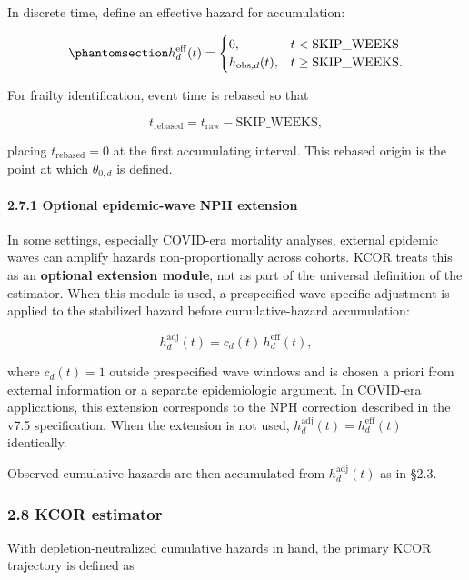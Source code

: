 \documentclass[
]{article}
\begin{document}
In discrete time, define an effective hazard for accumulation:

\begin{equation}\protect\phantomsection\label{eq:effective-hazard-skip}{
h_d^{\mathrm{eff}}(t)=
\begin{cases}
0, & t < \mathrm{SKIP\_WEEKS} \\
h_{\mathrm{obs},d}(t), & t \ge \mathrm{SKIP\_WEEKS}.
\end{cases}
}\end{equation}

For frailty identification, event time is rebased so that

\[
t_{\mathrm{rebased}} = t_{\mathrm{raw}} - \mathrm{SKIP\_WEEKS},
\]

placing \(t_{\mathrm{rebased}}=0\) at the first accumulating interval.
This rebased origin is the point at which \(\theta_{0,d}\) is defined.

\paragraph{2.7.1 Optional epidemic-wave NPH
extension}\label{optional-epidemic-wave-nph-extension}

In some settings, especially COVID-era mortality analyses, external
epidemic waves can amplify hazards non-proportionally across cohorts.
KCOR treats this as an \textbf{optional extension module}, not as part
of the universal definition of the estimator. When this module is used,
a prespecified wave-specific adjustment is applied to the stabilized
hazard before cumulative-hazard accumulation:

\[
h_d^{\mathrm{adj}}(t)=c_d(t)\,h_d^{\mathrm{eff}}(t),
\]

where \(c_d(t)=1\) outside prespecified wave windows and is chosen a
priori from external information or a separate epidemiologic argument.
In COVID-era applications, this extension corresponds to the NPH
correction described in the v7.5 specification. When the extension is
not used, \(h_d^{\mathrm{adj}}(t)=h_d^{\mathrm{eff}}(t)\) identically.

Observed cumulative hazards are then accumulated from
\(h_d^{\mathrm{adj}}(t)\) as in §2.3.

\subsubsection{2.8 KCOR estimator}\label{kcor-estimator}

With depletion-neutralized cumulative hazards in hand, the primary KCOR
trajectory is defined as
\end{document}
